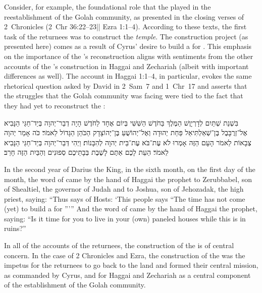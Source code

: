 Consider, for example, the foundational role that the \temple played in the reestablishment of the Golah community, as presented in the closing verses of 2~Chronicles (2~Chr 36:22--23|| Ezra 1:1--4). According to these texts, the first task of the returnees was to construct the \emph{temple}. The construction project (as presented here) comes as a result of Cyrus' desire to build a \temple for \yahweh. This emphasis on the importance of the \temple's reconstruction aligns with sentiments from the other accounts of the \temple's construction in Haggai and Zechariah (albeit with important differences as well). The account in Haggai 1:1--4, in particular, evokes the same rhetorical question asked by David in 2~Sam~7 and 1~Chr~17 and asserts that the struggles that the Golah community was facing were tied to the fact that they had yet to reconstruct the \temple:
\begin{hebrewtext}
    ‏בִּשְׁנַת שְׁתַּיִם לְדָרְיָוֶשׁ הַמֶּלֶךְ בַּחֹדֶשׁ הַשִּׁשִּׁי בְּיוֹם אֶחָד לַחֹדֶשׁ הָיָה דְבַר־יְהוָה בְּיַד־חַגַּי הַנָּבִיא אֶל־זְרֻבָּבֶל בֶּן־שְׁאַלְתִּיאֵל פַּחַת יְהוּדָה וְאֶל־יְהוֹשֻׁעַ בֶּן־יְהוֹצָדָק הַכֹּהֵן הַגָּדוֹל לֵאמֹר׃ 
    כֹּה אָמַר יְהוָה צְבָאוֹת לֵאמֹר הָעָם הַזֶּה אָמְרוּ לֹא עֶת־בֹּא עֶת־בֵּית יְהוָה לְהִבָּנוֹת׃  
    וַיְהִי דְּבַר־יְהוָה בְּיַד־חַגַּי הַנָּבִיא לֵאמֹר׃ 
    הַעֵת לָכֶם אַתֶּם לָשֶׁבֶת בְּבָתֵּיכֶם סְפוּנִים וְהַבַּיִת הַזֶּה חָרֵב׃
\end{hebrewtext}
\begin{translation}
    In the second year of Darius the King, in the sixth month, on the first day of the month, the word of \yahweh came by the hand of Haggai the prophet to Zerubbabel, son of Shealtiel, the governor of Judah and to Joshua, son of Jehozadak, the high priest, saying: 
    ``Thus says \yahweh of Hosts: `This people says ``The time has not come (yet) to build a \temple for \yahweh'''''
    And the word of \yahweh came by the hand of Haggai the prophet, saying:
    ``Is it time for you to live in your (own) paneled houses while this \temple is in ruins?''
\end{translation}
\noindent
In all of the accounts of the returnees, the construction of the \temple is of central concern. In the case of 2 Chronicles and Ezra, the construction of the \temple was the impetus for the returnees to go back to the land and formed their central mission, as commanded by Cyrus, and for Haggai and Zechariah as a central component of the establishment of the Golah community. 

